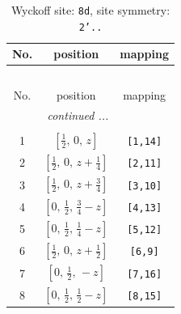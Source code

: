 \documentclass[fleqn,8pt]{jsarticle}
\begin{document}
\begin{longtable}{ccc}
\caption{Wyckoff site: {\tt 8d}, site symmetry: {\tt 2'..}}
 \\
 \hline \hline
No. & position & mapping \\ \hline \endfirsthead

\multicolumn{2}{l}{\tablename\ \thetable{}} \\
 \hline \hline
No. & position & mapping \\ \hline \endhead

 \hline \hline
\multicolumn{2}{r}{\footnotesize\it continued ...} \\ \endfoot

 \hline \hline
\multicolumn{2}{r}{} \\ \endlastfoot

1 & $\left[ \frac{1}{2},\, 0,\, z \right]$ & {\tt [1,14]} \\ \hline
2 & $\left[ \frac{1}{2},\, 0,\, z + \frac{1}{4} \right]$ & {\tt [2,11]} \\ \hline
3 & $\left[ \frac{1}{2},\, 0,\, z + \frac{3}{4} \right]$ & {\tt [3,10]} \\ \hline
4 & $\left[ 0,\, \frac{1}{2},\, \frac{3}{4} - z \right]$ & {\tt [4,13]} \\ \hline
5 & $\left[ 0,\, \frac{1}{2},\, \frac{1}{4} - z \right]$ & {\tt [5,12]} \\ \hline
6 & $\left[ \frac{1}{2},\, 0,\, z + \frac{1}{2} \right]$ & {\tt [6,9]} \\ \hline
7 & $\left[ 0,\, \frac{1}{2},\, - z \right]$ & {\tt [7,16]} \\ \hline
8 & $\left[ 0,\, \frac{1}{2},\, \frac{1}{2} - z \right]$ & {\tt [8,15]} \\
\end{longtable}
\renewcommand{\arraystretch}{1.2}
\end{document}
